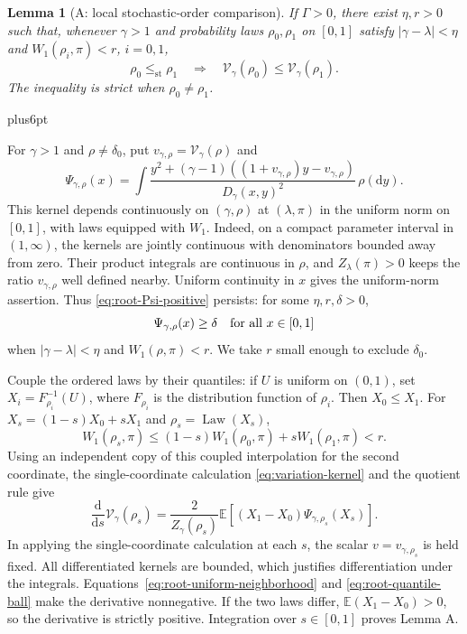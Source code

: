 \documentclass[11pt,reqno]{amsart}
\makeatletter
\theoremstyle{plain}
\newtheorem{lemma}[theorem]{Lemma}
\theoremstyle{definition}
\theoremstyle{remark}
\renewenvironment{proof}[1][\proofname]{%
  \par
  \pushQED{\qed}%
  \normalfont
  \topsep6pt plus6pt\relax
  \trivlist
  \item[\hskip\labelsep\slshape #1\@addpunct{.}]%
  \ignorespaces
}{%
  \popQED
  \endtrivlist
  \@endpefalse
}
\DeclareRobustCommand{\qed}{%
  \leavevmode\unskip\penalty9999\hbox{}\nobreak
  \ifmmode
    \makebox[0pt][l]{\qquad\hbox{\qedsymbol}}%
  \else
    \qquad\hbox{\qedsymbol}%
  \fi
}
\renewcommand{\qedsymbol}{\rule[.47pt]{4pt}{6pt}}
\numberwithin{equation}{section}
\newcommand{\E}{\mathbb E}
\newcommand{\Law}{\operatorname{Law}}
\makeatother
\begin{document}
\begin{lemma}[A: local stochastic-order comparison]\label{lem:root-A}
If $\Gamma>0$, there exist $\eta,r>0$ such that, whenever $\gamma>1$
and probability laws $\rho_0,\rho_1$ on $[0,1]$ satisfy
$|\gamma-\lambda|<\eta$ and $W_1(\rho_i,\pi)<r$, $i=0,1$,
\begin{equation}\label{eq:root-A}
 \rho_0\le_{\mathrm{st}}\rho_1
 \quad\Longrightarrow\quad
 \mathcal V_\gamma(\rho_0)\le\mathcal V_\gamma(\rho_1).
\end{equation}
The inequality is strict when $\rho_0\ne\rho_1$.
\end{lemma}

\begin{proof}
For $\gamma>1$ and $\rho\ne\delta_0$, put
$v_{\gamma,\rho}=\mathcal V_\gamma(\rho)$ and
\begin{equation}\label{eq:root-Psi-general}
 \Psi_{\gamma,\rho}(x)
 =\int\frac{y^2+(\gamma-1)((1+v_{\gamma,\rho})y-v_{\gamma,\rho})}
              {D_\gamma(x,y)^2}\,\rho(\mathrm dy).
\end{equation}
This kernel depends continuously on $(\gamma,\rho)$ at $(\lambda,\pi)$
in the uniform norm on $[0,1]$, with laws equipped with $W_1$.
Indeed, on a compact parameter interval in $(1,\infty)$, the kernels
are jointly continuous with denominators bounded away from zero.
Their product integrals are continuous in $\rho$, and
$Z_\lambda(\pi)>0$ keeps the ratio $v_{\gamma,\rho}$ well defined nearby.
Uniform continuity in $x$ gives the uniform-norm assertion.
Thus \eqref{eq:root-Psi-positive} persists: for some
$\eta,r,\delta>0$,
\begin{equation}\label{eq:root-uniform-neighborhood}
 \Psi_{\gamma,\rho}(x)\ge\delta
 \quad\hbox{for all }x\in[0,1]
\end{equation}
when $|\gamma-\lambda|<\eta$ and $W_1(\rho,\pi)<r$.
We take $r$ small enough to exclude $\delta_0$.

Couple the ordered laws by their quantiles: if $U$ is uniform on $(0,1)$,
set $X_i=F_{\rho_i}^{-1}(U)$, where $F_{\rho_i}$ is the
distribution function of $\rho_i$. Then $X_0\le X_1$. For
$X_s=(1-s)X_0+sX_1$ and $\rho_s=\Law(X_s)$,
\begin{equation}\label{eq:root-quantile-ball}
 W_1(\rho_s,\pi)
 \le(1-s)W_1(\rho_0,\pi)+sW_1(\rho_1,\pi)<r.
\end{equation}
Using an independent copy of this coupled interpolation for the second
coordinate, the single-coordinate calculation
\eqref{eq:variation-kernel} and the quotient rule give
\begin{equation}\label{eq:root-transport}
 \frac{\mathrm d}{\mathrm ds}\mathcal V_\gamma(\rho_s)
 =\frac{2}{Z_\gamma(\rho_s)}
   \E[(X_1-X_0)\Psi_{\gamma,\rho_s}(X_s)].
\end{equation}
In applying the single-coordinate calculation at each $s$, the scalar
$v=v_{\gamma,\rho_s}$ is held fixed. All differentiated kernels are
bounded, which justifies differentiation under the integrals.
Equations~\eqref{eq:root-uniform-neighborhood} and
\eqref{eq:root-quantile-ball} make the derivative nonnegative. If the
two laws differ, $\E(X_1-X_0)>0$, so the derivative is strictly positive.
Integration over $s\in[0,1]$ proves Lemma A.
\end{proof}
\end{document}
